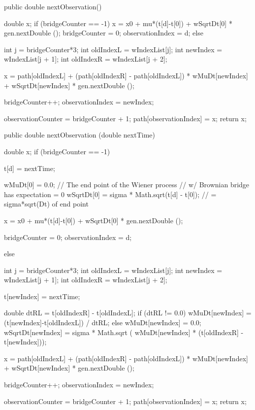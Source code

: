 \begin{code}\begin{hide}

   public double nextObservation() {
        double x;
        if (bridgeCounter == -1) {
            x = x0 + mu*(t[d]-t[0]) + wSqrtDt[0] * gen.nextDouble ();
            bridgeCounter = 0;
            observationIndex = d;
        } else {
           int j = bridgeCounter*3;
           int oldIndexL = wIndexList[j];
           int newIndex  = wIndexList[j + 1];
           int oldIndexR = wIndexList[j + 2];

           x = path[oldIndexL] +
             (path[oldIndexR] - path[oldIndexL])
             * wMuDt[newIndex] + wSqrtDt[newIndex] * gen.nextDouble ();

           bridgeCounter++;
           observationIndex = newIndex;
        }
        observationCounter = bridgeCounter + 1;
        path[observationIndex] = x;
        return x;
    }

   public double nextObservation (double nextTime) {
        double x;
        if (bridgeCounter == -1) {
            t[d] = nextTime;

            wMuDt[0]   = 0.0;  // The end point of the Wiener process
                               //  w/ Brownian bridge has expectation = 0
            wSqrtDt[0] = sigma * Math.sqrt(t[d] - t[0]);
                               // = sigma*sqrt(Dt) of end point

            x = x0 + mu*(t[d]-t[0]) + wSqrtDt[0] * gen.nextDouble ();

            bridgeCounter = 0;
            observationIndex = d;
        } else {
            int j = bridgeCounter*3;
            int oldIndexL = wIndexList[j];
            int newIndex  = wIndexList[j + 1];
            int oldIndexR = wIndexList[j + 2];

            t[newIndex] = nextTime;

            double dtRL = t[oldIndexR] - t[oldIndexL];
            if (dtRL != 0.0) {
                wMuDt[newIndex] = (t[newIndex]-t[oldIndexL]) / dtRL;
            } else {
                wMuDt[newIndex] = 0.0;
            }
            wSqrtDt[newIndex] = sigma * Math.sqrt (
               wMuDt[newIndex] * (t[oldIndexR] - t[newIndex]));

            x = path[oldIndexL] +
              (path[oldIndexR] - path[oldIndexL])
              * wMuDt[newIndex] + wSqrtDt[newIndex] * gen.nextDouble ();

            bridgeCounter++;
            observationIndex = newIndex;
        }
        observationCounter = bridgeCounter + 1;
        path[observationIndex] = x;
        return x;
    }


\end{hide}
\end{code}
